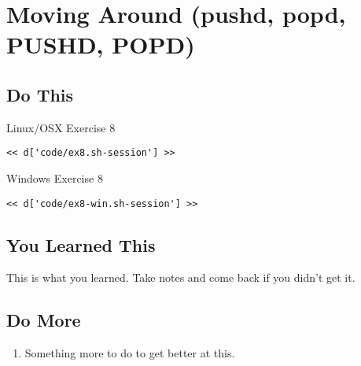 \chapter{Moving Around (pushd, popd, PUSHD, POPD)}

\section{Do This}

\begin{code}{Linux/OSX Exercise 8}
\begin{Verbatim}
<< d['code/ex8.sh-session'] >>
\end{Verbatim}
\end{code}

\begin{code}{Windows Exercise 8}
\begin{Verbatim}
<< d['code/ex8-win.sh-session'] >>
\end{Verbatim}
\end{code}

\section{You Learned This}

This is what you learned.  Take notes and come back if you didn't get it.

\section{Do More}

\begin{enumerate}
\item Something more to do to get better at this.
\end{enumerate}

